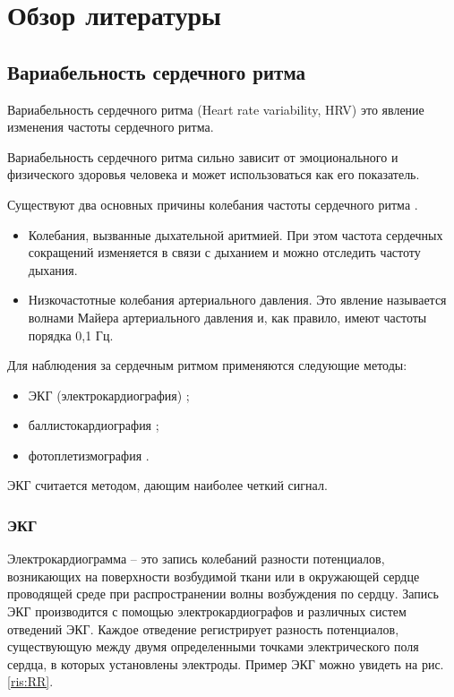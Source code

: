 \chapter{Обзор литературы}

\section{Вариабельность сердечного ритма }

Вариабельность сердечного ритма (Heart rate variability, HRV) это явление изменения частоты сердечного ритма.

Вариабельность сердечного ритма сильно зависит от эмоционального \cite{hrv_and_sensitivity, hrv_and_respiratory} и физического \cite{hrv_and_phisical_health} здоровья человека и может использоваться как его показатель.

Существуют два основных причины колебания частоты сердечного ритма \cite{two_rates_hrv}.

\begin{itemize}
	\item Колебания, вызванные дыхательной аритмией. При этом частота сердечных сокращений изменяется в связи с дыханием и можно отследить частоту дыхания.
	\item Низкочастотные колебания артериального давления. Это явление называется волнами Майера \cite{mayer_wave} артериального давления и, как правило, имеют частоты порядка 0,1 Гц.
\end{itemize}

Для наблюдения за сердечным ритмом применяются следующие методы:

\begin{itemize}
	\item ЭКГ (электрокардиография) \cite{EKG};
	\item баллистокардиография  \cite{Ballistocardiograms};
	\item фотоплетизмография \cite{Photoplethysmography}.
\end{itemize}

ЭКГ считается методом, дающим наиболее четкий сигнал.

\subsection{ЭКГ}

Электрокардиограмма – это запись колебаний разности потенциалов, возникающих на поверхности возбудимой ткани или в окружающей сердце проводящей среде при распространении волны возбуждения по сердцу.\cite{ekg1} Запись ЭКГ производится с помощью электрокардиографов и различных систем отведений ЭКГ. Каждое отведение регистрирует разность потенциалов, существующую между двумя определенными точками электрического поля сердца, в которых установлены электроды. Пример ЭКГ можно увидеть на рис. \ref{ris:RR}.

